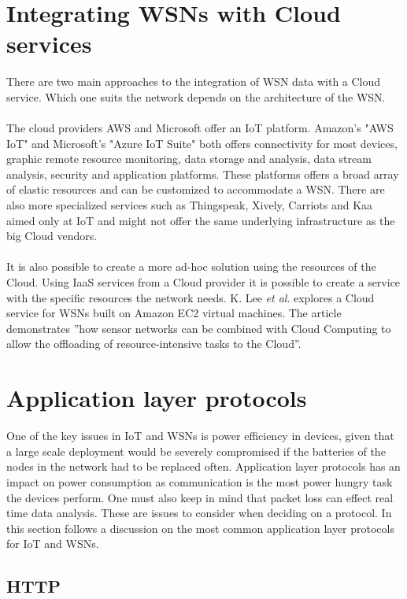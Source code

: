 \documentclass[]{uiophd}
\begin{document}
\section{Integrating WSNs with Cloud services}
There are two main approaches to the integration of WSN data with a Cloud service. Which one suits the network depends on the architecture of the WSN.
\\\\
The cloud providers AWS and Microsoft offer an IoT platform. Amazon's "AWS IoT" and Microsoft's "Azure IoT Suite" both offers connectivity for most devices, graphic remote resource monitoring, data storage and analysis, data stream analysis, security and application platforms. These platforms offers a broad array of elastic resources and can be customized to accommodate a WSN. There are also more specialized services such as Thingspeak, Xively, Carriots and Kaa aimed only at IoT and might not offer the same underlying infrastructure as the big Cloud vendors.
\\\\
It is also possible to create a more ad-hoc solution using the resources of the Cloud. Using IaaS services from a Cloud provider it is possible to create a service with the specific resources the network needs. K. Lee \textit{et al}. \cite{5678063} explores a Cloud service for WSNs built on Amazon EC2 virtual machines. The article demonstrates ''how sensor networks can be combined with Cloud Computing to allow the offloading of resource-intensive tasks to the Cloud''\cite[p.~7]{5678063}.

\section{Application layer protocols}
One of the key issues in IoT and WSNs is power efficiency in devices, given that a large scale deployment would be severely compromised if the batteries of the nodes in the network had to be replaced often. Application layer protocols has an impact on power consumption as communication is the most power hungry task the devices perform. One must also keep in mind that packet loss can effect real time data analysis. These are issues to consider when deciding on a protocol. In this section follows a discussion on the most common application layer protocols for IoT and WSNs.

\subsection{HTTP}
 
\end{document}
